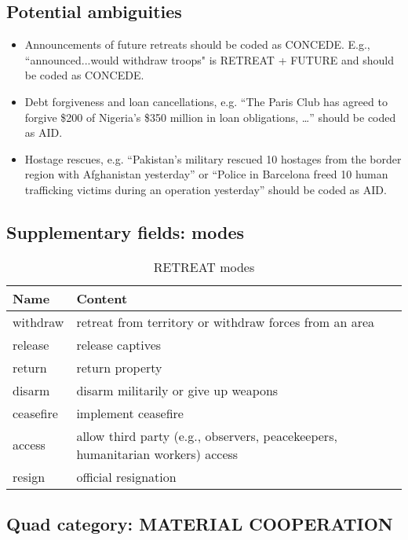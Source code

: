 \documentclass[11pt]{report}
\newcommand{\plcat}[1]{\textsf{#1}}
\begin{document}
\subsection{Potential ambiguities}

\begin{itemize}
\item Announcements of future retreats should be coded as \plcat{CONCEDE}. E.g., ``announced...would withdraw troops" is \plcat{RETREAT} + \plcat{FUTURE} and should be coded as \plcat{CONCEDE}.
\item Debt forgiveness and loan cancellations, e.g. ``The Paris Club has agreed to forgive \$200 of Nigeria’s \$350 million in loan obligations, \dots'' should be coded as \plcat{AID}.
\item Hostage rescues, e.g. ``Pakistan’s military rescued 10 hostages from the border region with Afghanistan yesterday'' or ``Police in Barcelona freed 10 human trafficking victims during an operation yesterday'' should be coded as \plcat{AID}.
\end{itemize}

\subsection{Supplementary fields: modes}

\begin{table}[htp]
\caption{RETREAT modes}
\begin{center}
\begin{tabular}{|l|p{13cm}|}
\hline
Name & Content \\
\hline
withdraw & retreat from territory or withdraw forces from an area\\
release & release captives \\
return & return property \\
disarm & disarm militarily or give up weapons\\
ceasefire & implement ceasefire\\
access & allow third party (e.g., observers, peacekeepers, humanitarian workers) access \\
resign & official resignation \\
\hline
\end{tabular}
\end{center}
\label{tab:retreatmode}
\end{table}%

\subsection{Quad category: MATERIAL COOPERATION}
\end{document}
